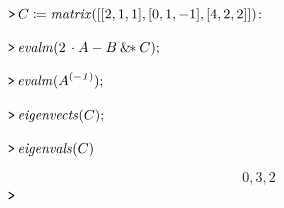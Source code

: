 \documentclass{article}
\begin{document}
\mapleinput
{$ \displaystyle \texttt{>\,} C \coloneqq \mathit{matrix} ([[2,1,1],[0,1,-1],[4,2,2]])\colon  $}

\mapleinput
{$ \displaystyle \texttt{>\,} \mathit{evalm} (2\,\cdot A -B \:\&\!\!*C); $}

\mapleinput
{$ \displaystyle \texttt{>\,} \mathit{evalm} (A^{\mathit{(-1)}});
\\
  $}

\mapleinput
{$ \displaystyle \texttt{>\,} \mathit{eigenvects} (C); $}

\mapleinput
{$ \displaystyle \texttt{>\,} \mathit{eigenvals} (C) $}

\begin{dmath}\label{(20)}
0,3,2
\end{dmath}
\mapleinput
{$ \displaystyle \texttt{>\,} \, $}
\end{document}
